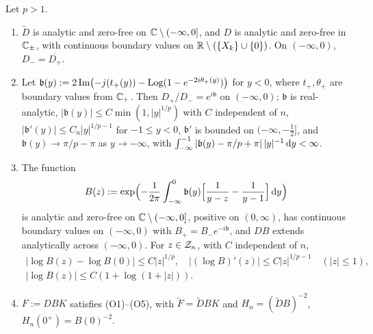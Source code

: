 \begin{lemma}\label{lem:binetcut}
Let $p>1$.
\begin{enumerate}
\item[(i)] $\tilde D$ is analytic and zero-free on $\mathbb{C}\setminus(-\infty,0]$, and $D$ is analytic and zero-free in
  $\mathbb{C}_\pm$, with continuous boundary values on $\mathbb{R}\setminus(\{X_k\}\cup\{0\})$. On $(-\infty,0)$, $D_-=\overline{D_+}$.
\item[(ii)] Let $\mathfrak b(y):=2\operatorname{Im}\bigl(-j(t_+(y))-\operatorname{Log}(1-e^{-2i\theta_+(y)})\bigr)$ for $y<0$, where $t_+,\theta_+$
  are boundary values from $\mathbb{C}_+$. Then $D_+/D_-=e^{i\mathfrak b}$ on $(-\infty,0)$; $\mathfrak b$ is real-analytic,
  $|\mathfrak b(y)|\le C\min(1,|y|^{1/p})$ with $C$ independent of $n$, $|\mathfrak b'(y)|\le C_n|y|^{1/p-1}$ for
  $-1\le y<0$, $\mathfrak b'$ is bounded on $(-\infty,-\frac12]$, and $\mathfrak b(y)\to\pi/p-\pi$ as $y\to-\infty$, with
  $\int_{-\infty}^{-1}|\mathfrak b(y)-\pi/p+\pi|\,|y|^{-1}\,\mathrm{d} y<\infty$.
\item[(iii)] The function
  \begin{equation}\label{eq:B}
    B(z):=\exp\Bigl(-\frac1{2\pi}\int_{-\infty}^0\mathfrak b(y)\Bigl[\frac1{y-z}-\frac1{y-1}\Bigr]\,\mathrm{d} y\Bigr)
  \end{equation}
  is analytic and zero-free on $\mathbb{C}\setminus(-\infty,0]$, positive on $(0,\infty)$, has continuous boundary values on
  $(-\infty,0)$ with $B_+=B_-e^{-i\mathfrak b}$, and $DB$ extends analytically across $(-\infty,0)$. For $z\in\mathcal{Z}_n$, with
  $C$ independent of $n$,
  \begin{equation}\label{eq:B-bounds}
  \begin{gathered}
    |\log B(z)-\log B(0)|\le C|z|^{1/p},\quad |(\log B)'(z)|\le C|z|^{1/p-1}\quad(|z|\le1),\\
    |\log B(z)|\le C(1+\log(1+|z|)).
  \end{gathered}
  \end{equation}
\item[(iv)] $F:=DBK$ satisfies (O1)--(O5), with $\tilde F=\tilde DBK$ and $H_n=(\tilde DB)^{-2}$, $H_n(0^+)=B(0)^{-2}$.
\end{enumerate}
\end{lemma}

